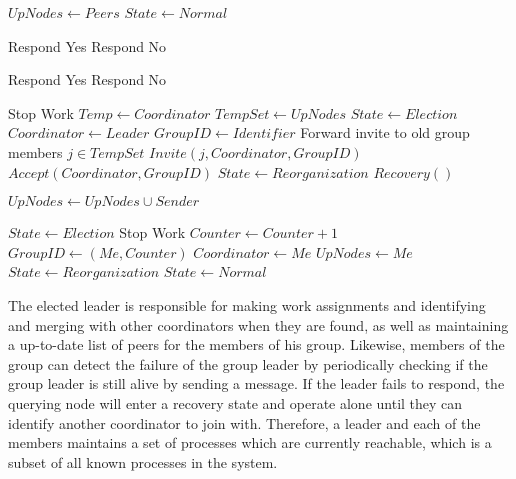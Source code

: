 \begin{algorithmic}
\State

        \State $UpNodes \gets Peers$
        \State $State \gets Normal$      
    \EndIf
\EndFunction

\State

        \State Respond Yes
    \Else
        \State Respond No
    \EndIf
\EndFunction

\State

        \State Respond Yes
    \Else
        \State Respond No
    \EndIf
\EndFunction

\State

        \Return
    \EndIf
    \State Stop Work
    \State $Temp \gets Coordinator$
    \State $TempSet \gets UpNodes$
    \State $State \gets Election$
    \State $Coordinator \gets Leader$
    \State $GroupID \gets Identifier$
        \State Forward invite to old group members
        \For $j \in TempSet$
            \State $Invite(j,Coordinator,GroupID)$
        \EndFor
    \EndIf
    \State $Accept(Coordinator,GroupID)$
    \State $State \gets Reorganization$
        \State $Recovery()$
    \EndIf
\EndFunction

\State

        \State $UpNodes \gets UpNodes \cup {Sender}$
    \EndIf
\EndFunction

\State

    \State $State \gets Election$
    \State Stop Work
    \State $Counter \gets Counter + 1$
    \State $GroupID \gets (Me,Counter)$
    \State $Coordinator \gets Me$
    \State $UpNodes \gets {Me}$
    \State $State \gets Reorganization$
    \State $State \gets Normal$
\EndFunction

\end{algorithmic}


The elected leader is responsible for making work assignments and identifying 
and merging with other coordinators when they are found, as well as maintaining 
a up-to-date list of peers for the members of his group.  Likewise, members of 
the group can detect the failure of the group leader by periodically checking 
if the group leader is still alive by sending a message. If the leader fails to 
respond, the querying node will enter a recovery state and operate alone until 
they can identify another coordinator to join with. Therefore, a leader and each
of the members maintains a set of processes which are currently reachable, which
is a subset of all known processes in the system.

